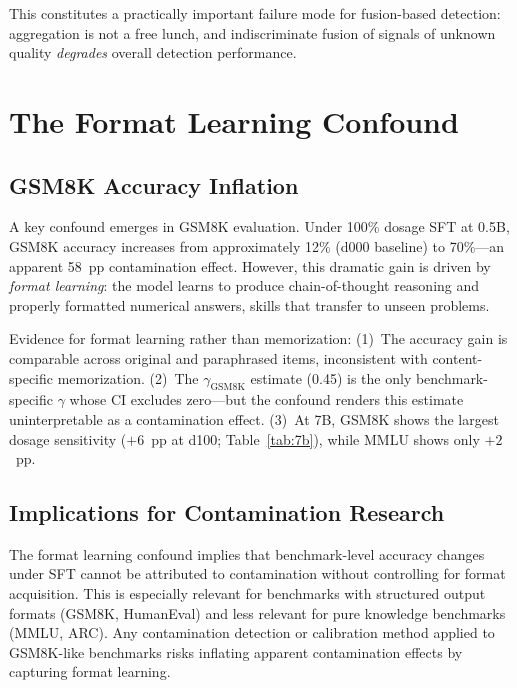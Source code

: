 \documentclass[11pt]{article}
\begin{document}
This constitutes a practically important failure mode for fusion-based detection: aggregation is not a free lunch, and indiscriminate fusion of signals of unknown quality \emph{degrades} overall detection performance.


\section{The Format Learning Confound}
\label{sec:format}

\subsection{GSM8K Accuracy Inflation}

A key confound emerges in GSM8K evaluation.
Under 100\% dosage SFT at 0.5B, GSM8K accuracy increases from approximately 12\% (d000 baseline) to 70\%---an apparent 58~pp contamination effect.
However, this dramatic gain is driven by \emph{format learning}: the model learns to produce chain-of-thought reasoning and properly formatted numerical answers, skills that transfer to unseen problems.

Evidence for format learning rather than memorization:
(1)~The accuracy gain is comparable across original and paraphrased items, inconsistent with content-specific memorization.
(2)~The $\gamma_{\text{GSM8K}}$ estimate (0.45) is the only benchmark-specific $\gamma$ whose CI excludes zero---but the confound renders this estimate uninterpretable as a contamination effect.
(3)~At 7B, GSM8K shows the largest dosage sensitivity ($+6$~pp at d100; Table~\ref{tab:7b}), while MMLU shows only $+2$~pp.

\subsection{Implications for Contamination Research}

The format learning confound implies that benchmark-level accuracy changes under SFT cannot be attributed to contamination without controlling for format acquisition.
This is especially relevant for benchmarks with structured output formats (GSM8K, HumanEval) and less relevant for pure knowledge benchmarks (MMLU, ARC).
Any contamination detection or calibration method applied to GSM8K-like benchmarks risks inflating apparent contamination effects by capturing format learning.
\end{document}
